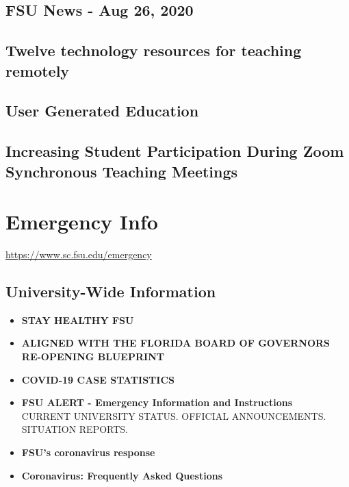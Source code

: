 \documentclass[12pt,a4paper]{article}
\begin{document}
\subsection{FSU News - Aug 26, 2020}

\subsection{Twelve technology resources for teaching remotely}

\subsection{User Generated Education}

\subsection{Increasing Student Participation During Zoom Synchronous Teaching Meetings}

\section{Emergency Info}
\url{https://www.sc.fsu.edu/emergency}

\subsection{University-Wide Information}
\begin{itemize}
    \item \textbf{STAY HEALTHY FSU}
    \item \textbf{ALIGNED WITH THE FLORIDA BOARD OF GOVERNORS RE-OPENING BLUEPRINT}
    \item \textbf{COVID-19 CASE STATISTICS}
    \item \textbf{FSU ALERT - Emergency Information and Instructions} \\
    CURRENT UNIVERSITY STATUS. OFFICIAL ANNOUNCEMENTS. SITUATION REPORTS.
    \item \textbf{FSU's coronavirus response}
    \item \textbf{Coronavirus: Frequently Asked Questions}
\end{itemize}
\end{document}
